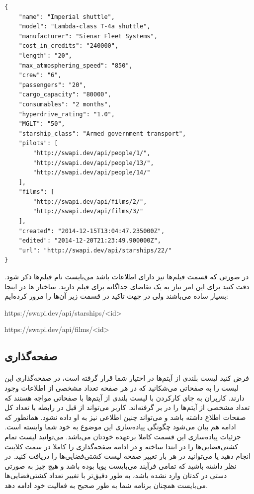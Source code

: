 \documentclass[../main.tex]{subfiles}
\begin{document}
\begin{latin}
\begin{lstlisting}[]
{
    "name": "Imperial shuttle",
    "model": "Lambda-class T-4a shuttle",
    "manufacturer": "Sienar Fleet Systems",
    "cost_in_credits": "240000",
    "length": "20",
    "max_atmosphering_speed": "850",
    "crew": "6",
    "passengers": "20",
    "cargo_capacity": "80000",
    "consumables": "2 months",
    "hyperdrive_rating": "1.0",
    "MGLT": "50",
    "starship_class": "Armed government transport",
    "pilots": [
        "http://swapi.dev/api/people/1/",
        "http://swapi.dev/api/people/13/",
        "http://swapi.dev/api/people/14/"
    ],
    "films": [
        "http://swapi.dev/api/films/2/",
        "http://swapi.dev/api/films/3/"
    ],
    "created": "2014-12-15T13:04:47.235000Z",
    "edited": "2014-12-20T21:23:49.900000Z",
    "url": "http://swapi.dev/api/starships/22/"
}
\end{lstlisting}
\end{latin}

در صورتی که قسمت فیلم‌ها نیز دارای اطلاعات باشد می‌بایست نام فیلم‌ها ذکر شود. دقت کنید برای این امر نیاز به یک تقاضای جداگانه برای فیلم دارید. ساختار ها در اینجا بسیار ساده می‌باشند ولی در جهت تاکید در قسمت زیر آن‌ها را مرور کرده‌ایم:

\begin{itemize}\begin{latinitems}
  \item https://swapi.dev/api/starships/<id>
  \item https://swapi.dev/api/films/<id>
\end{latinitems}\end{itemize}

\subsection{صفحه‌گذاری}
\paragraph{}
فرض کنید لیست بلندی از آیتم‌ها در اختیار شما قرار گرفته است، در صفحه‌گذاری این لیست را به صفحاتی می‌شکانید که در هر صفحه تعداد مشخصی از اطلاعات وجود دارند. کاربران به جای کارکردن با لیست بلندی از آیتم‌ها با صفحاتی مواجه هستند که تعداد مشخصی از آیتم‌ها را در بر گرفته‌اند. کاربر می‌تواند از قبل در رابطه با تعداد کل صفحات اطلاع داشته باشد و می‌تواند چنین اطلاعی نیز به او داده نشود. همانطور که ادامه هم بیان می‌شود چگونگی پیاده‌سازی این موضوع به خود شما وابسته است.
جزئیات پیاده‌سازی این قسمت کاملا برعهده خودتان می‌باشد.
می‌توانید لیست تمام کشتی‌فضایی‌ها را در ابتدا ساخته و در ادامه صفحه‌گذاری را کاملا در سمت کلاینت انجام دهید یا می‌توانید در هر بار تغییر صفحه لیست کشتی‌فضایی‌ها را دریافت کنید.
در نظر داشته باشید که تمامی فرآیند می‌بایست پویا بوده باشد و هیچ چیز به صورتی دستی در کدتان وارد نشده باشد، به طور دقیق‌تر با تغییر تعداد کشتی‌فضایی‌ها می‌بایست همچنان برنامه شما به طور صحیح به فعالیت خود ادامه دهد.
\end{document}
